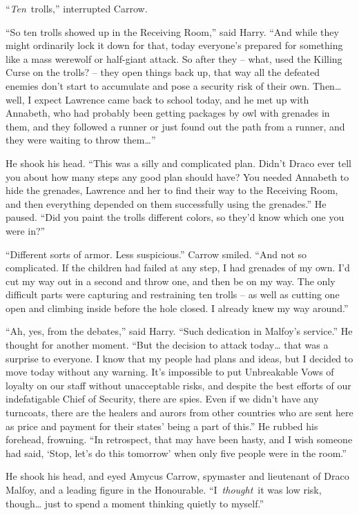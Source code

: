 ``\emph{Ten}~trolls,'' interrupted Carrow.

``So ten trolls showed up in the Receiving Room,'' said Harry. ``And
while they might ordinarily lock it down for that, today everyone's
prepared for something like a mass werewolf or half-giant attack. So
after they -- what, used the Killing Curse on the trolls? -- they open
things back up, that way all the defeated enemies don't start to
accumulate and pose a security risk of their own. Then\ldots{} well, I
expect Lawrence came back to school today, and he met up with Annabeth,
who had probably been getting packages by owl with grenades in them, and
they followed a runner or just found out the path from a runner, and
they were waiting to throw them\ldots{}''

He shook his head. ``This was a silly and complicated plan. Didn't Draco
ever tell you about how many steps any good plan should have? You needed
Annabeth to hide the grenades, Lawrence and her to find their way to the
Receiving Room, and then everything depended on them successfully using
the grenades.'' He paused. ``Did you paint the trolls different colors,
so they'd know which one you were in?''

``Different sorts of armor. Less suspicious.'' Carrow smiled. ``And not
so complicated. If the children had failed at any step, I had grenades
of my own. I'd cut my way out in a second and throw one, and then be on
my way. The only difficult parts were capturing and restraining ten
trolls -- as well as cutting one open and climbing inside before the
hole closed. I already knew my way around.''

``Ah, yes, from the debates,'' said Harry. ``Such dedication in Malfoy's
service.'' He thought for another moment. ``But the decision to attack
today\ldots{} that was a surprise to everyone. I know that my people had
plans and ideas, but I decided to move today without any warning. It's
impossible to put Unbreakable Vows of loyalty on our staff without
unacceptable risks, and despite the best efforts of our indefatigable
Chief of Security, there are spies. Even if we didn't have any
turncoats, there are the healers and aurors from other countries who are
sent here as price and payment for their states' being a part of this.''
He rubbed his forehead, frowning. ``In retrospect, that may have been
hasty, and I wish someone had said, `Stop, let's do this tomorrow' when
only five people were in the room.''

He shook his head, and eyed Amycus Carrow, spymaster and lieutenant of
Draco Malfoy, and a leading figure in the Honourable.
``I~\emph{thought}~it was low risk, though\ldots{} just to spend a
moment thinking quietly to myself.''

